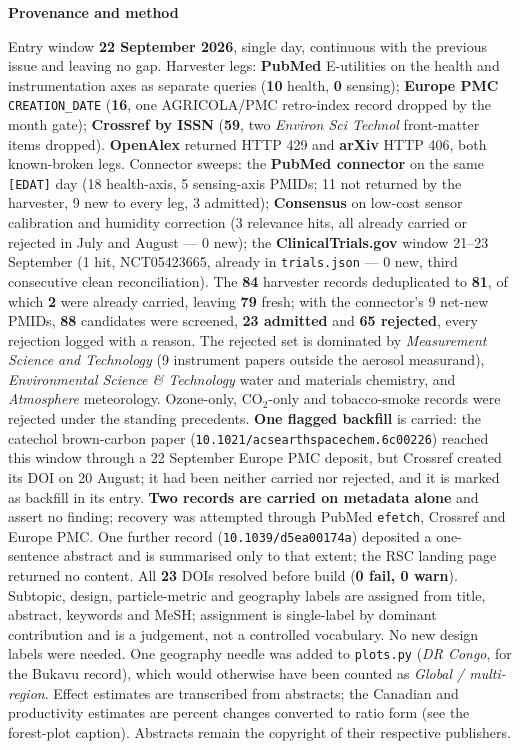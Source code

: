 \documentclass[10pt]{article}
\begin{document}
\vspace{4mm}
\begin{keybox}
{\sffamily\bfseries\footnotesize\color{Deep}Provenance and method}\\[1.2mm]
{\fontsize{7.2}{8.8}\selectfont
Entry window \textbf{22 September 2026}, single day, continuous with the previous issue and
leaving no gap. Harvester legs: \textbf{PubMed} E-utilities on the health and
instrumentation axes as separate queries (\textbf{10} health, \textbf{0} sensing);
\textbf{Europe PMC} \texttt{CREATION\_DATE} (\textbf{16}, one AGRICOLA/PMC retro-index
record dropped by the month gate); \textbf{Crossref by ISSN} (\textbf{59}, two
\textit{Environ Sci Technol} front-matter items dropped). \textbf{OpenAlex} returned HTTP
429 and \textbf{arXiv} HTTP 406, both known-broken legs. Connector sweeps: the
\textbf{PubMed connector} on the same \texttt{[EDAT]} day (18 health-axis, 5 sensing-axis
PMIDs; 11 not returned by the harvester, 9 new to every leg, 3 admitted);
\textbf{Consensus} on low-cost sensor calibration and humidity correction (3 relevance
hits, all already carried or rejected in July and August --- 0 new); the
\textbf{ClinicalTrials.gov} window 21--23 September (1 hit, NCT05423665, already in
\texttt{trials.json} --- 0 new, third consecutive clean reconciliation).
The \textbf{84} harvester records deduplicated to \textbf{81}, of which \textbf{2} were
already carried, leaving \textbf{79} fresh; with the connector's 9 net-new PMIDs,
\textbf{88} candidates were screened, \textbf{23 admitted} and \textbf{65 rejected}, every
rejection logged with a reason. The rejected set is dominated by \textit{Measurement
Science and Technology} (9 instrument papers outside the aerosol measurand),
\textit{Environmental Science \& Technology} water and materials chemistry, and
\textit{Atmosphere} meteorology. Ozone-only, CO$_2$-only and tobacco-smoke records were
rejected under the standing precedents. \textbf{One flagged backfill} is carried: the
catechol brown-carbon paper (\texttt{10.1021/acsearthspacechem.6c00226}) reached this window
through a 22 September Europe PMC deposit, but Crossref created its DOI on 20 August; it had
been neither carried nor rejected, and it is marked as backfill in its entry.
\textbf{Two records are carried on metadata alone} and assert no finding; recovery was
attempted through PubMed \texttt{efetch}, Crossref and Europe PMC. One further record
(\texttt{10.1039/d5ea00174a}) deposited a one-sentence abstract and is summarised only to
that extent; the RSC landing page returned no content. All \textbf{23} DOIs resolved before
build (\textbf{0 fail, 0 warn}).
Subtopic, design, particle-metric and geography labels are assigned from title, abstract,
keywords and MeSH; assignment is single-label by dominant contribution and is a judgement,
not a controlled vocabulary. No new design labels were needed. One geography needle was
added to \texttt{plots.py} (\textit{DR Congo}, for the Bukavu record), which would
otherwise have been counted as \textit{Global / multi-region}. Effect estimates are
transcribed from abstracts; the Canadian and productivity estimates are percent changes
converted to ratio form (see the forest-plot caption). Abstracts remain the copyright of
their respective publishers.\par}
\end{keybox}
\end{document}
